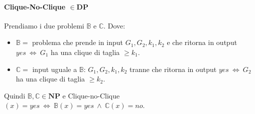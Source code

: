 \documentclass[a4paper]{article}
\theoremstyle{definition}
\newcommand{\np}{\mathbf{NP}}
\newcommand{\DP}{\mathbf{DP}}
\newcommand{\prob}[1]{\mathbb{#1}}
\begin{document}
			\paragraph{Clique-No-Clique $ \in \DP $} Prendiamo i due problemi $ \prob{B} $ e $ \prob{C} $. Dove:
			\begin{itemize}
				\item $ \prob{B} = $ problema che prende in input $ G_1, G_2, k_1, k_2 $ e che ritorna in output $ yes\ \Leftrightarrow\ G_1 $ ha una clique di taglia $ \geq k_1 $.
				\item $ \prob{C} = $ input uguale a $ \prob{B} $: $ G_1, G_2, k_1, k_2 $ tranne che ritorna in output $ yes\ \Leftrightarrow\ G_2 $ ha una clique di taglia $ \geq k_2 $.
			\end{itemize}
			Quindi $ \prob{B}, \prob{C} \in \np $ e Clique-no-Clique$(x) = yes\ \Leftrightarrow\ \prob{B}(x) = yes \ \wedge \ \prob{C}(x) = no $.
			
\end{document}
